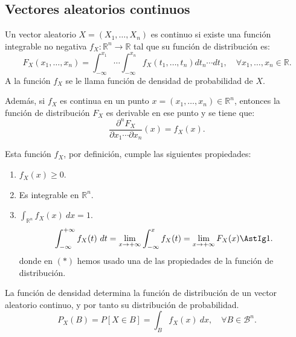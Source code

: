 \subsection{Vectores aleatorios continuos}

\begin{definicion}
    Un vector aleatorio $X=(X_1, \ldots, X_n)$ es continuo si existe una función integrable no negativa $f_X:\mathbb{R}^n\to \mathbb{R}$ tal que su función de distribución es:
    \begin{equation*}
        F_X(x_1, \ldots, x_n) = \int_{-\infty}^{x_1}\cdots\int_{-\infty}^{x_n} f_X(t_1, \ldots, t_n) d t_n \cdots dt_1,
        \quad \forall x_1, \ldots, x_n \in \mathbb{R}.
    \end{equation*}
    A la función $f_X$ se le llama función de densidad de probabilidad de $X$.
\end{definicion}

Además, si $f_X$ es continua en un punto $x=(x_1, \ldots, x_n)\in \mathbb{R}^n$, entonces la función de distribución $F_X$ es derivable en ese punto y se tiene que:
\begin{equation*}
    \frac{\partial^n F_X}{\partial x_1\cdots \partial x_n}(x) = f_X(x).
\end{equation*}

Esta función $f_X$, por definición, cumple las siguientes propiedades:
\begin{enumerate}
    \item $f_X(x)\geq 0$.
    \item Es integrable en $\mathbb{R}^n$.
    \item $\int_{\mathbb{R}^n} f_X(x)~d x = 1$.
    \begin{equation*}
        \int_{-\infty}^{+\infty}f_X(t)~d t =
        \lim_{x\to +\infty} \int_{-\infty}^{x} f_X(t) = \lim_{x\to +\infty} F_X(x) \AstIg 1.
    \end{equation*}
    donde en $(\ast)$ hemos usado una de las propiedades de la función de distribución.
\end{enumerate}

La función de densidad determina la función de distribución de un vector aleatorio continuo, y por tanto su distribución de probabilidad.
\begin{equation*}
    P_X(B) = P[X\in B]= \int_B f_X(x)~d x, \quad \forall B\in \mathcal{B}^n.
\end{equation*}

